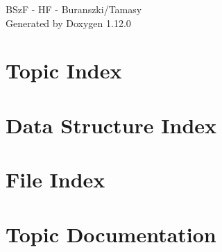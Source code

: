 \documentclass[twoside]{book}
\newcommand{\+}{\discretionary{\mbox{\scriptsize$\hookleftarrow$}}{}{}}
\newcommand{\clearemptydoublepage}{%
    \newpage{\pagestyle{empty}\cleardoublepage}%
  }
\begin{document}
  \raggedbottom
    \hypersetup{pageanchor=false,
                bookmarksnumbered=true,
                pdfencoding=unicode
               }
  \begin{titlepage}
  \vspace*{7cm}
  \begin{center}%
  {\Large BSz\+F -\/ HF -\/ Buranszki/\+Tamasy}\\
  \vspace*{1cm}
  {\large Generated by Doxygen 1.12.0}\\
  \end{center}
  \end{titlepage}
  \clearemptydoublepage
  \tableofcontents
  \clearemptydoublepage
  \hypersetup{pageanchor=true}





\chapter{Topic Index}

\chapter{Data Structure Index}

\chapter{File Index}

\chapter{Topic Documentation}

















\end{document}
